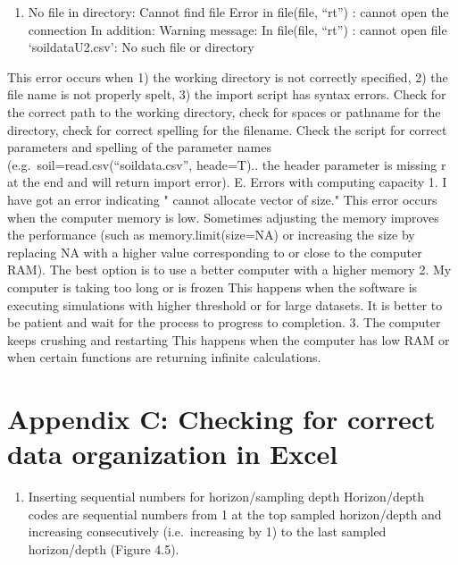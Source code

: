 \documentclass[
  10pt,
  b5paper,
]{book}
\providecommand{\tightlist}{%
  \setlength{\itemsep}{0pt}\setlength{\parskip}{0pt}}
\begin{document}
\begin{enumerate}
\def\labelenumi{\arabic{enumi}.}
\tightlist
\item
  No file in directory: Cannot find file
  Error in file(file, ``rt'') : cannot open the connection In addition: Warning message:
  In file(file, ``rt'') :
  cannot open file `soildataU2.csv': No such file or directory
\end{enumerate}

This error occurs when 1) the working directory is not correctly specified, 2) the file name is not properly spelt, 3) the import script has syntax errors. Check for the correct path to the working directory, check for spaces or pathname for the directory, check for correct spelling for the filename. Check the script for correct parameters and spelling of the parameter names (e.g.~soil=read.csv(``soildata.csv'', heade=T).. the header parameter is missing r at the end and will return import error).
E. Errors with computing capacity
1. I have got an error indicating " cannot allocate vector of size."
This error occurs when the computer memory is low. Sometimes adjusting the memory improves the performance (such as memory.limit(size=NA) or increasing the size by replacing NA with a higher value corresponding to or close to the computer RAM). The best option is to use a better computer with a higher memory
2. My computer is taking too long or is frozen
This happens when the software is executing simulations with higher threshold or for large datasets. It is better to be patient and wait for the process to progress to completion.
3. The computer keeps crushing and restarting
This happens when the computer has low RAM or when certain functions are returning infinite calculations.

\hypertarget{appendix-c-checking-for-correct-data-organization-in-excel}{%
\section*{Appendix C: Checking for correct data organization in Excel}\label{appendix-c-checking-for-correct-data-organization-in-excel}}

\begin{enumerate}
\def\labelenumi{\arabic{enumi}.}
\tightlist
\item
  Inserting sequential numbers for horizon/sampling depth
  Horizon/depth codes are sequential numbers from 1 at the top sampled horizon/depth and increasing consecutively (i.e.~increasing by 1) to the last sampled horizon/depth (Figure 4.5).
\end{enumerate}
\end{document}
